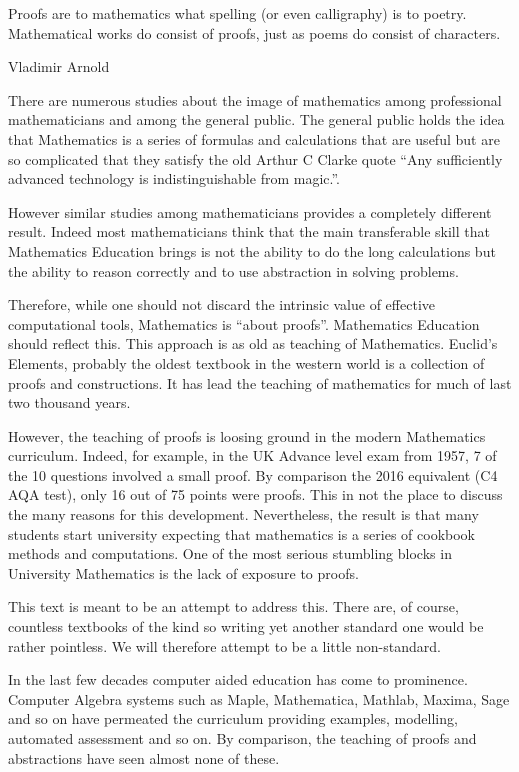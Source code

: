 \preface
\epigraph{Proofs are to mathematics what spelling (or even calligraphy) is to poetry. Mathematical works do consist of proofs, just as poems do consist of characters.}{Vladimir Arnold}

There are numerous studies about the image of mathematics among professional mathematicians and among the general public. The general public holds the idea that Mathematics is a series of formulas and calculations that are useful but are so complicated that they satisfy the old Arthur C Clarke quote ``Any sufficiently advanced technology is indistinguishable from magic.''.

However similar studies among mathematicians provides a completely different result. Indeed most mathematicians think that the main transferable skill that Mathematics Education brings is not the ability to do the long calculations but the ability to reason correctly and to use abstraction in solving problems.

Therefore, while one should not discard the intrinsic value of effective computational tools, Mathematics is ``about proofs''. Mathematics Education should reflect this. This approach is as old as teaching of Mathematics. Euclid's Elements, probably the oldest textbook in the western world is a collection of proofs and constructions. It has lead the teaching of mathematics for much of last two thousand years. 

However, the teaching of proofs is loosing ground  in the modern Mathematics curriculum. Indeed, for example,  in the UK   Advance level exam from 1957,  7 of the 10 questions involved a small proof. By comparison the 2016 equivalent (C4 AQA test), only 16 out of 75 points were proofs. This in not the place to discuss the many reasons for this development. Nevertheless, the result is that many students start university expecting that mathematics  is a series of cookbook methods and computations. One of the most serious stumbling blocks in University Mathematics is the lack of exposure to proofs.

This text is meant to be an attempt to address this. There are, of course, countless textbooks of the kind so writing yet another standard one would be rather pointless. We will  therefore attempt to be a little non-standard.

In the last few decades computer aided education has come to prominence. Computer Algebra systems such as Maple, Mathematica, Mathlab, Maxima, Sage and so on have permeated the curriculum providing examples, modelling, automated assessment and so on. By comparison, the teaching of proofs and abstractions have seen almost none of these.

